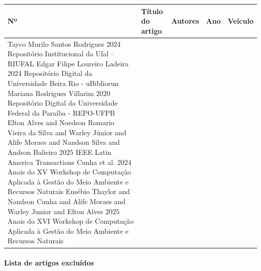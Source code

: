 \begin{table}[H]
\centering
\begingroup
\small
\setlength{\tabcolsep}{3pt}
\begin{tabularx}{0.96\textwidth}{|P{0.7cm}|Y|P{3.4cm}|P{1.4cm}|P{2.4cm}|}
\hline
\textbf{Nº} & \textbf{Título do artigo} & \textbf{Autores} & \textbf{Ano} & \textbf{Veículo} \\
\hline
\setcounter{artigoIncluido}{0}
{Tayco Murilo Santos Rodrigues}
{2024}
{Repositório Institucional da Ufal -- RIUFAL}
{Edgar Filipe Loureiro Ladeira}
{2024}
{Repositório Digital da Universidade Beira Rio - uBibliorun}
{Mariana Rodrigues Villarim}
{2020}
{Repositório Digital da Universidade Federal da Paraíba - REPO-UFPB}
{Elton Alves and Noedson Romario Vieira da Silva and Warley Júnior and Alife Moraes and Nandson Silva and Andson Balieiro}
{2025}
{IEEE Latin America Transactions}
{Cunha et al.}
{2024}
{Anais do XV Workshop de Computação Aplicada à Gestão do Meio Ambiente e Recursos Naturais}
{Eusébio Thaylor and Nandson Cunha and Alife Moraes and Warley Junior and Elton Alves}
{2025}
{Anais do XVI Workshop de Computação Aplicada à Gestão do Meio Ambiente e Recursos Naturais}

\end{tabularx}
\endgroup
\end{table}


\paragraph*{Lista de artigos excluídos}



